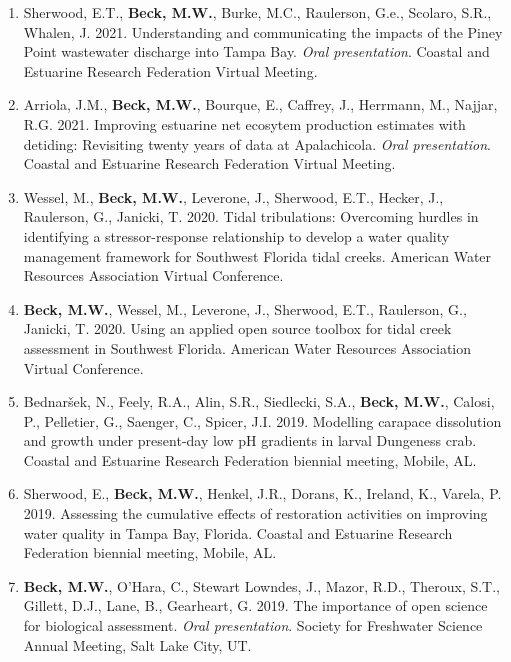 \documentclass[letterpaper,12pt]{article}
\begin{document}
\begin{enumerate}

\item Sherwood, E.T., {\bf Beck, M.W.}, Burke, M.C., Raulerson, G.e., Scolaro, S.R., Whalen, J. 2021. Understanding and communicating the impacts of the Piney Point wastewater discharge into Tampa Bay. \textit{Oral presentation}. Coastal and Estuarine Research Federation Virtual Meeting.

\item Arriola, J.M., {\bf Beck, M.W.}, Bourque, E., Caffrey, J., Herrmann, M., Najjar, R.G. 2021. Improving estuarine net ecosytem production estimates with detiding: Revisiting twenty years of data at Apalachicola. \textit{Oral presentation}. Coastal and Estuarine Research Federation Virtual Meeting.

\item Wessel, M., \textbf{Beck, M.W.}, Leverone, J., Sherwood, E.T., Hecker, J., Raulerson, G., Janicki, T. 2020. Tidal tribulations: Overcoming hurdles in identifying a stressor-response relationship to develop a water quality management framework for Southwest Florida tidal creeks. American Water Resources Association Virtual Conference. 

\item \textbf{Beck, M.W.}, Wessel, M., Leverone, J., Sherwood, E.T., Raulerson, G., Janicki, T. 2020. Using an applied open source toolbox for tidal creek assessment in Southwest Florida. American Water Resources Association Virtual Conference. 

\item Bednar\v{s}ek, N., Feely, R.A., Alin, S.R., Siedlecki, S.A., \textbf{Beck, M.W.}, Calosi, P., Pelletier, G., Saenger, C., Spicer, J.I. 2019. Modelling carapace dissolution and growth under present-day low pH gradients in larval Dungeness crab.  Coastal and Estuarine Research Federation biennial meeting, Mobile, AL.

\item Sherwood, E., \textbf{Beck, M.W.}, Henkel, J.R., Dorans, K., Ireland, K., Varela, P. 2019. Assessing the cumulative effects of restoration activities on improving water quality in Tampa Bay, Florida.  Coastal and Estuarine Research Federation biennial meeting, Mobile, AL.

\item \textbf{Beck, M.W.}, O'Hara, C., Stewart Lowndes, J., Mazor, R.D., Theroux, S.T., Gillett, D.J., Lane, B., Gearheart, G. 2019. The importance of open science for biological assessment. \textit{Oral presentation}. Society for Freshwater Science Annual Meeting, Salt Lake City, UT.


\end{enumerate}
\end{document}
